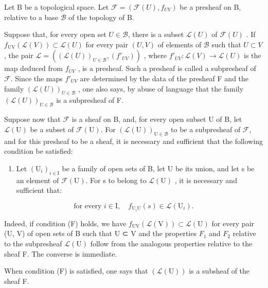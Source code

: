 Let B be a topological space. Let \(\mathcal{F} = (\mathcal{F}(U), f_{UV})\) be a presheaf on B, relative to a base \(\mathcal{B}\) of the topology of B.

Suppose that, for every open set \(U \in \mathcal{B}\), there is a subset \(\mathcal{L}(U)\) of \(\mathcal{F}(U)\) . If \(f_{\mathrm{UV}}(\mathcal{L}(V)) \subset \mathcal{L}(U)\) for every pair \((U, V)\) of elements of \(\mathcal{B}\) such that \(U \subset V\), the pair \(\mathcal{L} = ((\mathcal{L}(U))_{U \in \mathcal{B}}, (f'_{UV}))\) , where \(f'_{UV} \colon \mathcal{L}(V) \to \mathcal{L}(U)\) is the map deduced from \(f_{UV}\) , is a presheaf. Such a presheaf is called a subpresheaf of \(\mathcal{F}\). Since the maps \(f'_{UV}\) are determined by the data of the presheaf F and the family \((\mathcal{L}(U))_{U \in \mathcal{B}}\) , one also says, by abuse of language that the family \((\mathcal{L}(U))_{U \in \mathcal{B}}\) is a subpresheaf of F.

Suppose now that \(\mathcal{F}\) is a sheaf on B, and, for every open subset U of B, let \(\mathcal{L}(\mathrm{U})\) be a subset of \(\mathcal{F}(\mathrm{U})\). For \((\mathcal{L}(\mathrm{U}))_{\mathrm{U}\in \mathcal{B}}\) to be a subpresheaf of \(\mathcal{F}\), and for this presheaf to be a sheaf, it is necessary and sufficient that the following condition be satisfied:

\begin{enumerate}
\def\labelenumi{(\Alph{enumi})}
\setcounter{enumi}{5}
\tightlist
\item
  Let \((\mathrm{U}_{i})_{i\in\mathrm{I}}\) be a family of open sets of B, let U be its union, and let s be an element of \(\mathcal{F}(\mathrm{U})\). For s to belong to \(\mathcal{L}(\mathrm{U})\) , it is necessary and sufficient that:
\end{enumerate}

\[
\text{for every } i \in \mathrm{I},\quad f_{\mathrm{U}_{i}\mathrm{U}}(s)\in\mathcal{L}(\mathrm{U}_{i}).
\]

Indeed, if condition (F) holds, we have \(f_{\mathrm{UV}}(\mathcal{L}(\mathrm{V})) \subset \mathcal{L}(\mathrm{U})\) for every pair (U, V) of open sets of B such that U ⊂ V and the properties \(F_{1}\) and \(F_{2}\) relative to the subpresheaf \(\mathcal{L}(\mathrm{U})\) follow from the analogous properties relative to the sheaf F. The converse is immediate.

When condition (F) is satisfied, one says that \((\mathcal{L}(\mathrm{U}))\) is a subsheaf of the sheaf F.

